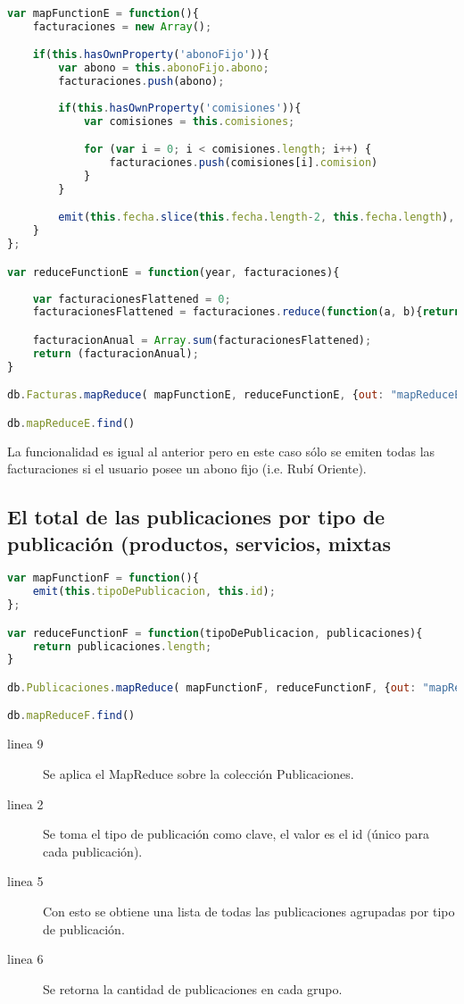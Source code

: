 \begin{lstlisting}[language=JavaScript]
var mapFunctionE = function(){
	facturaciones = new Array();

	if(this.hasOwnProperty('abonoFijo')){
		var abono = this.abonoFijo.abono;
		facturaciones.push(abono);
	
		if(this.hasOwnProperty('comisiones')){
			var comisiones = this.comisiones;

			for (var i = 0; i < comisiones.length; i++) {
				facturaciones.push(comisiones[i].comision)
			}
		}

		emit(this.fecha.slice(this.fecha.length-2, this.fecha.length), facturaciones)
	}
};

var reduceFunctionE = function(year, facturaciones){
	
	var facturacionesFlattened = 0;
	facturacionesFlattened = facturaciones.reduce(function(a, b){return a.concat(b)}, []);

	facturacionAnual = Array.sum(facturacionesFlattened);
	return (facturacionAnual);
}

db.Facturas.mapReduce( mapFunctionE, reduceFunctionE, {out: "mapReduceE"} )

db.mapReduceE.find()
\end{lstlisting}

La funcionalidad es igual al anterior pero en este caso sólo se emiten todas las facturaciones si el usuario posee un abono fijo (i.e. Rubí Oriente).\\

\newpage
\subsection{El total de las publicaciones por tipo de publicación (productos, servicios, mixtas}

\begin{lstlisting}[language=JavaScript]
var mapFunctionF = function(){
	emit(this.tipoDePublicacion, this.id);
};

var reduceFunctionF = function(tipoDePublicacion, publicaciones){
	return publicaciones.length;
}

db.Publicaciones.mapReduce( mapFunctionF, reduceFunctionF, {out: "mapReduceF"} )

db.mapReduceF.find()
\end{lstlisting}

\begin{description}
 \item[linea 9] Se aplica el MapReduce sobre la colección Publicaciones.
 \item[linea 2] Se toma el tipo de publicación como clave, el valor es el id (único para cada publicación).
 \item[linea 5] Con esto se obtiene una lista de todas las publicaciones agrupadas por tipo de publicación.
 \item[linea 6] Se retorna la cantidad de publicaciones en cada grupo.
\end{description}